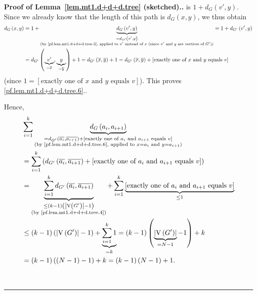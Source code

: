 \documentclass[numbers=enddot,12pt,final,onecolumn,notitlepage]{scrartcl}%
\theoremstyle{definition}
\newenvironment{proof}[1][Proof]{\noindent\textbf{#1.} }{\ \rule{0.5em}{0.5em}}
\let\sumnonlimits\sum
\renewcommand{\sum}{\sumnonlimits\limits}
\newcommand{\abs}[1]{\left| #1 \right|}
\newcommand{\tup}[1]{\left( #1 \right)}
\newcommand{\ive}[1]{\left[ #1 \right]}
\newcommand{\verts}[1]{\operatorname{V}\left( #1 \right)}
\newcommand{\underbrack}[2]{\underbrace{#1}_{\substack{#2}}}
\begin{document}
\begin{proof}[Proof of Lemma~\ref{lem.mt1.d+d+d.tree} (sketched).]
{is $1 + d_G \tup{v', y}$. Since we already know that the length of
this path is $d_G \tup{x, y}$, we thus obtain
\begin{align*}
d_G \tup{x, y}
&= 1 + \underbrack{d_G \tup{v', y}}
                  {= d_{G'} \tup{v', y} \\
                   \text{(by \eqref{pf.lem.mt1.d+d+d.tree.5}, applied }
                   \text{to } v' \text{ instead of } x
                   \text{ (since } v' \text{ and } y \text{ are }
                   \text{vertices of } G' \text{))}}
 = 1 + d_{G'} \tup{v', y} \\
&= d_{G'} \tup{\underbrack{v'}{= \overline{x}},
               \underbrack{y}{= \overline{y}}} + 1
 = d_{G'} \tup{\overline{x}, \overline{y}} + 1
 = d_{G'} \tup{\overline{x}, \overline{y}}
  + \ive{\text{exactly one of } x \text{ and } y
         \text{ equals } v }
\end{align*}
(since $1 = \ive{\text{exactly one of } x \text{ and } y
         \text{ equals } v }$).
This proves \eqref{pf.lem.mt1.d+d+d.tree.6}.}.

Hence,
\begin{align}
& \sum_{i=1}^k
  \underbrack{d_G \tup{a_i, a_{i+1}}}
             {= d_{G'} \tup{\overline{a_i}, \overline{a_{i+1}}}
              + \ive{\text{exactly one of } a_i \text{ and } a_{i+1}
                     \text{ equals } v } \\
              \text{(by \eqref{pf.lem.mt1.d+d+d.tree.6}, applied to }
              x = a_i \text{ and } y = a_{i+1} \text{)}}
\nonumber \\
&= \sum_{i=1}^k
   \tup{d_{G'} \tup{\overline{a_i}, \overline{a_{i+1}}}
          + \ive{\text{exactly one of } a_i \text{ and } a_{i+1}
              \text{ equals } v }}
\nonumber \\
&= \underbrack{\sum_{i=1}^k
                d_{G'} \tup{\overline{a_i}, \overline{a_{i+1}}}}
              {\leq \tup{k-1} \tup{\abs{\verts{G'}}-1} \\
                \text{(by \eqref{pf.lem.mt1.d+d+d.tree.4})}}
 + \sum_{i=1}^k
      \underbrack{\ive{\text{exactly one of } a_i \text{ and } a_{i+1}
                    \text{ equals } v }}
                 {\leq 1}
\nonumber \\
&\leq \tup{k-1} \tup{\abs{\verts{G'}}-1}
    + \underbrack{\sum_{i=1}^k 1}{= k}
= \tup{k-1} \tup{\underbrack{\abs{\verts{G'}}}{= N-1}
                 -1} + k
\nonumber \\
&= \tup{k-1} \tup{\tup{N-1} - 1} + k
= \tup{k-1} \tup{N-1} + 1 .
\label{pf.lem.mt1.d+d+d.tree.antigoal}
\end{align}


\end{proof}
\end{document}
